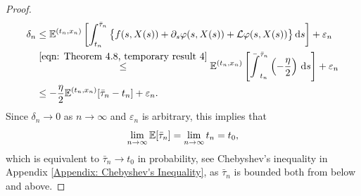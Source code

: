 \begin{proof}
\begin{align*}
        \delta_n &\leq \mathbb{E}^{(t_n,x_n)} \left[ \int_{t_n}^{\bar \tau_n} \big\{ f(s,X(s)) + \partial_s \varphi(s, X(s)) + \mathcal{L} \varphi(s, X(s)) \big\}  \,\mathrm{d} s \right] + \varepsilon_n \\
        & \overset{\eqref{eqn: Theorem 4.8, temporary result 4}}{\leq} \mathbb{E}^{(t_n,x_n)} \left[\bar \int_{t_n}^{\bar \tau_n}  \left(- \frac{\eta}{2} \right) \,\mathrm{d} s\right] + \varepsilon_n \\
        & \leq -\frac{\eta}{2} \mathbb{E}^{(t_n,x_n)} [\bar \tau_n - t_n] + \varepsilon_n.
    \end{align*}
    Since $\delta_n \rightarrow 0$ as $n \rightarrow \infty$ and $\varepsilon_n$ is arbitrary, this implies that 
    \begin{equation*}
        \lim_{n \rightarrow \infty} \mathbb{E} [\bar \tau_n] = \lim_{n \rightarrow \infty} t_n = t_0,
    \end{equation*}
    which is equivalent to $\bar \tau_n \rightarrow t_0$ in probability, see Chebyshev's inequality in Appendix \ref{Appendix: Chebyshev's Inequality}, as $\bar \tau_n$ is bounded both from below and above. 


\end{proof}
